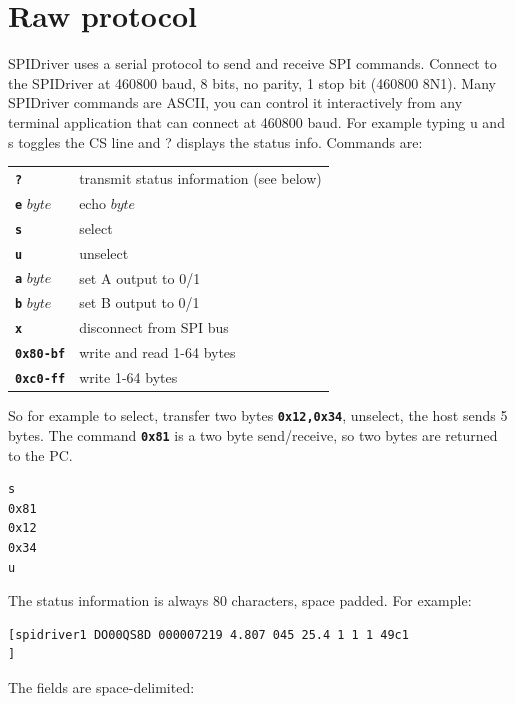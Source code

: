 \documentclass{article}
\newcommand{\mach}[1]{\texttt{\textbf{#1}}}
\newcommand{\gap}{\vspace{10pt}}
\begin{document}
\newpage
\section{Raw protocol}

SPIDriver uses a serial protocol to send and receive SPI commands.
Connect to the SPIDriver at 460800 baud, 8 bits, no parity, 1 stop bit (460800 8N1).
Many SPIDriver commands are ASCII, you can control it
interactively from any terminal application that can connect at 460800
baud. For example typing u and s toggles the CS line and ? displays the
status info.
Commands are:

\gap\begin{tabular}{ll}
\hline
\mach{?}        & transmit status information (see below)        \\
\mach{e} $byte$ & echo $byte$       \\
\mach{s}        & select        \\
\mach{u}        & unselect        \\
\mach{a} $byte$ & set A output to 0/1       \\
\mach{b} $byte$ & set B output to 0/1       \\
\mach{x}        & disconnect from SPI bus       \\
\mach{0x80-bf}  & write and read 1-64 bytes       \\
\mach{0xc0-ff}  & write 1-64 bytes        \\ \hline
\end{tabular}\gap

So for example to select, transfer two bytes
\mach{0x12,0x34},
unselect, the host sends 5 bytes.
The command \mach{0x81} is a two byte send/receive, so two bytes are returned to the PC.

\begin{lstlisting}
s
0x81
0x12
0x34
u
\end{lstlisting}


The status information is always 80 characters, space padded. For example:

{\scriptsize
\begin{framed}\begin{Verbatim}
[spidriver1 DO00QS8D 000007219 4.807 045 25.4 1 1 1 49c1                       ]
\end{Verbatim}
\end{framed}}

The fields are space-delimited:
\end{document}
